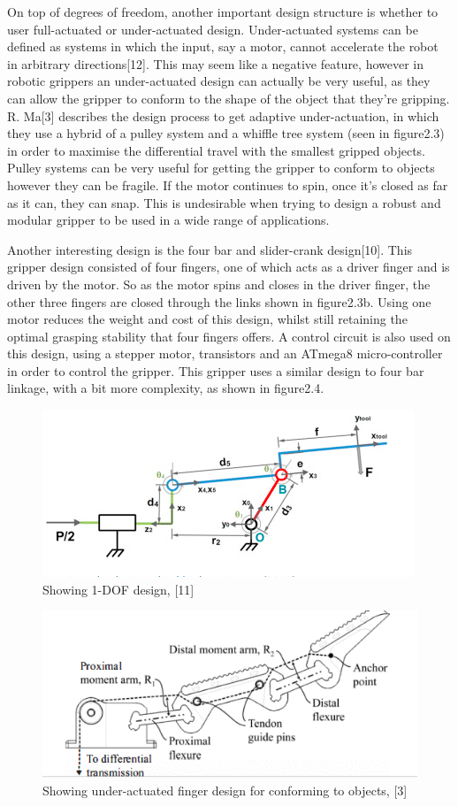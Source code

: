 \documentclass{l4proj}
\begin{document}
On top of degrees of freedom, another important design structure is whether to user full-actuated or under-actuated design. Under-actuated systems can be defined as systems in which the input, say a motor, cannot accelerate the robot in arbitrary directions[12]. This may seem like a negative feature, however in robotic grippers an under-actuated design can actually be very useful, as they can allow the gripper to conform to the shape of the object that they're gripping. R. Ma[3] describes the design process to get adaptive under-actuation, in which they use a hybrid of a pulley system and a whiffle tree system (seen in figure2.3) in order to maximise the differential travel with the smallest gripped objects. Pulley systems can be very useful for getting the gripper to conform to objects however they can be fragile. If the motor continues to spin, once it's closed as far as it can, they can snap. This is undesirable when trying to design a robust and modular gripper to be used in a wide range of applications. 

Another interesting design is the four bar and slider-crank design[10]. This gripper design consisted of four fingers, one of which acts as a driver finger and is driven by the motor. So as the motor spins and closes in the driver finger, the other three fingers are closed through the links shown in figure2.3b. Using one motor reduces the weight and cost of this design, whilst still retaining the optimal grasping stability that four fingers offers. A control circuit is also used on this design, using a stepper motor, transistors and an ATmega8 micro-controller in order to control the gripper. This gripper uses a similar design to four bar linkage, with a bit more complexity, as shown in figure2.4.


\begin{figure}[!ht]
    \centering
    \includegraphics[width=0.75\linewidth]{images/image1.png}    
    \caption{Showing 1-DOF design, [11]}
    \label{fig:image1} 
\end{figure}

\begin{figure}[!ht]
    \centering
    \includegraphics[width=0.75\linewidth]{images/image2.png}    

    \caption{Showing under-actuated finger design for conforming to objects, [3]}
\end{figure}
\end{document}
